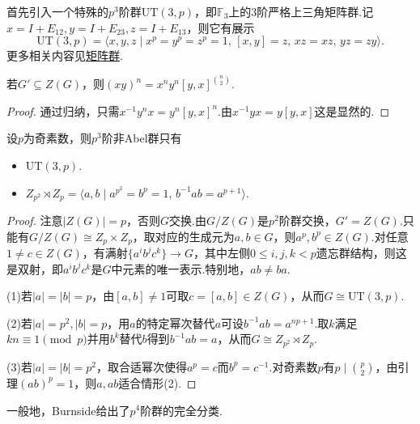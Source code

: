 首先引入一个特殊的$p^3$阶群$\mathrm{UT}(3,p)$，即$\mathbb{F}_3$上的$3$阶严格上三角矩阵群.记$x=I+E_{12},y=I+E_{23},z=I+E_{13}$，则它有展示
\[
	\mathrm{UT}(3,p)=\langle x,y,z\mid x^p=y^p=z^p=1,\,[x,y]=z,\,xz=xz,\,yz=zy\rangle .
\]
更多相关内容见\hyperlink{subsec:MatrixGrp}{矩阵群}.
\begin{lemma*}
	若$G'\subseteq Z(G)$，则$(xy)^n=x^ny^n[y,x]^{\binom{n}{2}}$.
\end{lemma*}
\begin{proof}
	通过归纳，只需$x^{-1}y^nx=y^n[y,x]^n$.由$x^{-1}yx=y[y,x]$这是显然的.
\end{proof}
\begin{prop}
	设$p$为奇素数，则$p^3$阶非Abel群只有
	\begin{itemize}
		\item $\mathrm{UT}(3,p)$.
		\item $Z_{p^2}\rtimes Z_p=\langle a,b\mid a^{p^2}=b^p=1,\,b^{-1}ab=a^{p+1}\rangle $.
	\end{itemize}
\end{prop}
\begin{proof}
	注意$|Z(G)|=p$，否则$G$交换.由$G/Z(G)$是$p^2$阶群交换，$G'=Z(G)$.只能有$G/Z(G)\cong Z_p\times Z_p$，取对应的生成元为$a,b\in G$，则$a^p,b^p\in Z(G)$.对任意$1\ne c\in Z(G)$，有满射$\{a^ib^jc^k\}\to G$，其中左侧$0\le i,j,k<p$遗忘群结构，则这是双射，即$a^ib^jc^k$是$G$中元素的唯一表示.特别地，$ab\ne ba$.

	(1)若$|a|=|b|=p$，由$[a,b]\ne 1$可取$c=[a,b]\in Z(G)$，从而$G\cong\mathrm{UT}(3,p)$.

	(2)若$|a|=p^2,|b|=p$，用$a$的特定幂次替代$a$可设$b^{-1}ab=a^{np+1}$.取$k$满足$kn\equiv 1\pmod p$并用$b^k$替代$b$得到$b^{-1}ab=a$，从而$G\cong Z_{p^2}\rtimes Z_p$.

	(3)若$|a|=|b|=p^2$，取合适幂次使得$a^p=c$而$b^p=c^{-1}$.对奇素数$p$有$p\mid\binom{p}{2}$，由引理$(ab)^p=1$，则$a,ab$适合情形(2).
\end{proof}
\begin{remark}
	一般地，Burnside给出了$p^4$阶群的完全分类.
\end{remark}

